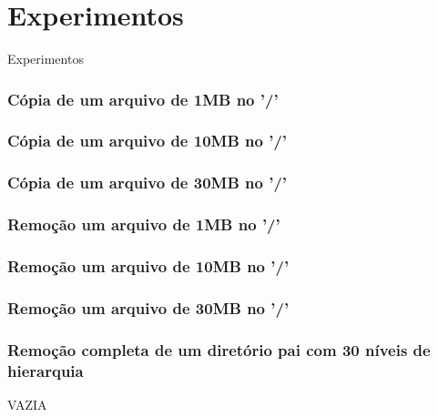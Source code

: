 \documentclass{beamer}
\begin{document}
\section{Experimentos}
\begin{frame}
\begin{LARGE}
\begin{center}
Experimentos
\end{center}
\end{LARGE}
\end{frame}


\begin{frame}
\frametitle{Cópia de um arquivo de 1MB no '/'} 

\justifying
\end{frame}


\begin{frame}
\frametitle{Cópia de um arquivo de 10MB no '/'} 

\justifying
\end{frame}


\begin{frame}
\frametitle{Cópia de um arquivo de 30MB no '/'} 

\justifying
\end{frame}


\begin{frame}
\frametitle{Remoção um arquivo de 1MB no '/'} 

\justifying
\end{frame}

\begin{frame}
\frametitle{Remoção um arquivo de 10MB no '/'} 

\justifying
\end{frame}

\begin{frame}
\frametitle{Remoção um arquivo de 30MB no '/'} 

\justifying
\end{frame}

\begin{frame}
\frametitle{Remoção completa de um diretório pai com 30 níveis de hierarquia} 
VAZIA
\justifying
\end{frame}
\end{document}
